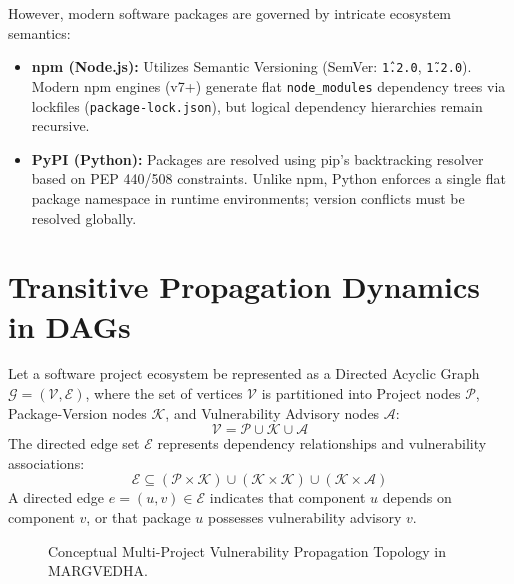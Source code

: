 \documentclass[12pt,a4paper,oneside]{report}
\begin{document}
However, modern software packages are governed by intricate ecosystem semantics:
\begin{itemize}
    \item \textbf{npm (Node.js):} Utilizes Semantic Versioning (SemVer: \texttt{\^1.2.0}, \texttt{\~1.2.0}). Modern npm engines (v7+) generate flat \texttt{node\_modules} dependency trees via lockfiles (\texttt{package-lock.json}), but logical dependency hierarchies remain recursive.
    \item \textbf{PyPI (Python):} Packages are resolved using pip's backtracking resolver based on PEP 440/508 constraints. Unlike npm, Python enforces a single flat package namespace in runtime environments; version conflicts must be resolved globally.
\end{itemize}

\section{Transitive Propagation Dynamics in DAGs}
Let a software project ecosystem be represented as a Directed Acyclic Graph $\mathcal{G} = (\mathcal{V}, \mathcal{E})$, where the set of vertices $\mathcal{V}$ is partitioned into Project nodes $\mathcal{P}$, Package-Version nodes $\mathcal{K}$, and Vulnerability Advisory nodes $\mathcal{A}$:
\begin{equation}
    \mathcal{V} = \mathcal{P} \cup \mathcal{K} \cup \mathcal{A}
\end{equation}
The directed edge set $\mathcal{E}$ represents dependency relationships and vulnerability associations:
\begin{equation}
    \mathcal{E} \subseteq (\mathcal{P} \times \mathcal{K}) \cup (\mathcal{K} \times \mathcal{K}) \cup (\mathcal{K} \times \mathcal{A})
\end{equation}
A directed edge $e = (u, v) \in \mathcal{E}$ indicates that component $u$ depends on component $v$, or that package $u$ possesses vulnerability advisory $v$. 

\begin{figure}[H]
    \centering
    \caption{Conceptual Multi-Project Vulnerability Propagation Topology in MARGVEDHA.}
    \label{fig:propagation_topology}
\end{figure}
\end{document}
